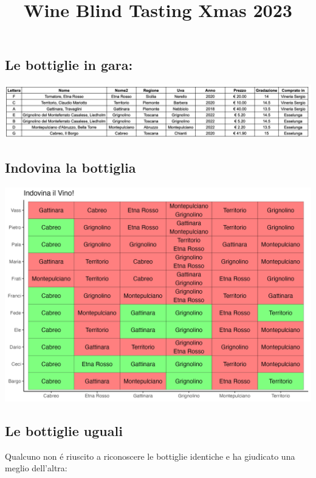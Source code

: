 \documentclass[
]{article}
\title{Wine Blind Tasting Xmas 2023}
\author{}
\date{\vspace{-2.5em}}
\begin{document}
\maketitle

\hypertarget{le-bottiglie-in-gara}{%
\subsection{Le bottiglie in gara:}\label{le-bottiglie-in-gara}}

\includegraphics[width=1\linewidth]{wineinfo}

\hypertarget{indovina-la-bottiglia}{%
\subsection{Indovina la bottiglia}\label{indovina-la-bottiglia}}

\includegraphics[width=1\linewidth]{plots/indoVino}

\hypertarget{le-bottiglie-uguali}{%
\subsection{Le bottiglie uguali}\label{le-bottiglie-uguali}}

Qualcuno non é riuscito a riconoscere le bottiglie identiche e ha
giudicato una meglio dell'altra:
\end{document}
